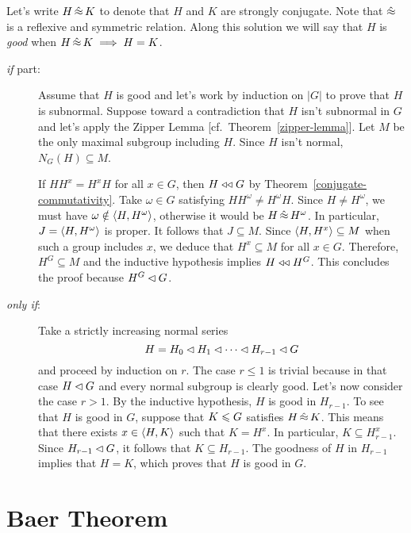 \newcommand{\sconj}{\op{\hat\approx}}
\begin{solution} Let's write $H\sconj K$ to denote that $H$ and $K$ are strongly conjugate. Note that $\sconj$ is a reflexive and symmetric relation. Along this solution we will say that $H$ is \textsl{good} when $H\sconj K\implies H=K$.

\begin{description}
    \item[\rm\textit{if\/} part:] Assume that $H$ is good and let's work by induction on $|G|$ to prove that $H$ is subnormal. Suppose toward a contradiction that $H$ isn't subnormal in $G$ and let's apply the Zipper Lemma [cf.~Theorem~\ref{zipper-lemma}]. Let $M$ be the only maximal subgroup including $H$. Since $H$ isn't normal, $N_G(H)\subseteq M$.
    
    If $HH^x=H^xH$ for all $x\in G$, then $H\mathrel{\triangleleft\triangleleft} G$ by Theorem~\ref{conjugate-commutativity}. Take $\omega\in G$ satisfying $HH^\omega\ne H^\omega H$. Since $H\ne H^\omega$, we must have $\omega\notin\langle H,H^\omega\rangle$, otherwise it would be $H\sconj H^\omega$. In particular, $J=\langle H,H^\omega\rangle$ is proper. It follows that $J\subseteq M$. Since $\langle H,H^x\rangle\subseteq M$ when such a group includes $x$, we deduce that $H^x\subseteq M$ for all $x\in G$. Therefore, $H^G\subseteq M$ and the inductive hypothesis implies $H\mathrel{\triangleleft\triangleleft} H^G$. This concludes the proof because $H^G\lhd G$.
    
    
    \item[\rm\textit{only if\/}:] Take a strictly increasing normal series
    $$
        H = H_0\lhd H_1\lhd\cdots\lhd H_{r-1}\lhd G
    $$
    and proceed by induction on $r$. The case $r\le1$ is trivial because in that case $H\lhd G$ and every normal subgroup is clearly good. Let's now consider the case $r>1$. By the inductive hypothesis, $H$ is good in $H_{r-1}$. To see that $H$ is good in $G$, suppose that $K\leqslant G$ satisfies $H\sconj K$. This means that there exists $x\in\langle H,K\rangle$ such that $K=H^x$. In particular, $K\subseteq H_{r-1}^x$. Since $H_{r-1}\lhd G$, it follows that $K\subseteq H_{r-1}$. The goodness of $H$ in $H_{r-1}$ implies that $H=K$, which proves that $H$ is good in $G$.
\end{description}
\end{solution}

\section{Baer Theorem}

